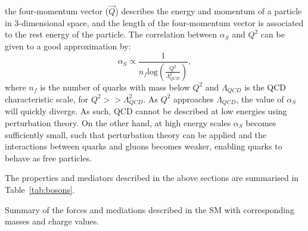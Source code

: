 \begin{itemize}
	the four-momentum vector ($\vec{Q}$) describes the energy and momentum of a particle in 3-dimensional space, and the length of the four-momentum vector is associated to the rest energy of the particle. The correlation between $\alpha_S$ and $Q^2$ can be given to a good approximation by:
	\begin{equation}
	\alpha_S\propto \frac{1}{n_f \mathrm{log}\left(\frac{Q^2}{\Lambda_{QCD}^2}\right)},
	\end{equation}
	where $n_f$ is the number of quarks with mass below $Q^2$ and $\Lambda_{QCD}$ is the \ac{QCD} characteristic scale, for $Q^2>>\Lambda_{QCD}^2$. As $Q^2$ approaches $\Lambda_{QCD}$, the value of $\alpha_S$ will quickly diverge.
	 As such, \ac{QCD} cannot be described at low energies using perturbation theory. 
	 On the other hand, at high energy scales $\alpha_S$ becomes sufficiently small, such that perturbation theory can be applied and the interactions between quarks and gluons becomes weaker, enabling quarks to behave as free particles.
	\end{itemize}		 
	
	The properties and mediators described in the above sections are summarised in Table~\ref{tab:bosons}.
	\begin{table}[!hbt]
	\centering
	\caption{Summary of the forces and mediations  described in the \ac{SM} with corresponding masses and charge values.}
		
	\label{tab:bosons}
	\end{table}
	
